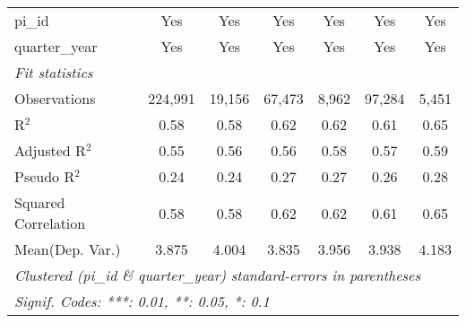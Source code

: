 \begin{tabular}{lcccccc}
   pi\_id                                                     & Yes           & Yes           & Yes           & Yes           & Yes           & Yes\\  
   quarter\_year                                              & Yes           & Yes           & Yes           & Yes           & Yes           & Yes\\  
   \midrule
   \emph{Fit statistics}\\
   Observations                                               & 224,991       & 19,156        & 67,473        & 8,962         & 97,284        & 5,451\\  
   R$^2$                                                      & 0.58          & 0.58          & 0.62          & 0.62          & 0.61          & 0.65\\  
   Adjusted R$^2$                                             & 0.55          & 0.56          & 0.56          & 0.58          & 0.57          & 0.59\\  
   Pseudo R$^2$                                               & 0.24          & 0.24          & 0.27          & 0.27          & 0.26          & 0.28\\  
   Squared Correlation                                        & 0.58          & 0.58          & 0.62          & 0.62          & 0.61          & 0.65\\  
Mean(Dep. Var.) & 3.875 & 4.004 & 3.835 & 3.956 & 3.938 & 4.183 \\
   \midrule \midrule
   \multicolumn{7}{l}{\emph{Clustered (pi\_id \& quarter\_year) standard-errors in parentheses}}\\
   \multicolumn{7}{l}{\emph{Signif. Codes: ***: 0.01, **: 0.05, *: 0.1}}\\
\end{tabular}
\par\endgroup
